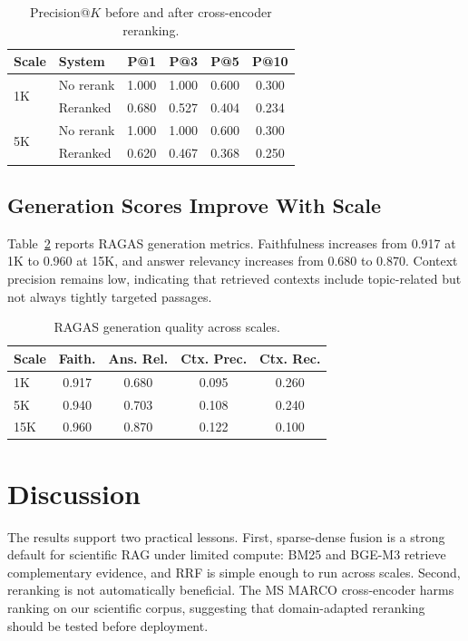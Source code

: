 \documentclass[11pt]{article}
\begin{document}
\begin{table}[!t]
\centering
\small
\caption{Precision@$K$ before and after cross-encoder reranking.}
\label{tab:rerank}
\begin{tabular}{llcccc}
\toprule
Scale & System & P@1 & P@3 & P@5 & P@10 \\
\midrule
\multirow{2}{*}{1K}
& No rerank & 1.000 & 1.000 & 0.600 & 0.300 \\
& Reranked & 0.680 & 0.527 & 0.404 & 0.234 \\
\midrule
\multirow{2}{*}{5K}
& No rerank & 1.000 & 1.000 & 0.600 & 0.300 \\
& Reranked & 0.620 & 0.467 & 0.368 & 0.250 \\
\bottomrule
\end{tabular}
\end{table}

\subsection{Generation Scores Improve With Scale}

Table~\ref{tab:ragas} reports RAGAS generation metrics. Faithfulness increases from 0.917 at 1K to 0.960 at 15K, and answer relevancy increases from 0.680 to 0.870. Context precision remains low, indicating that retrieved contexts include topic-related but not always tightly targeted passages.

\begin{table}[!t]
\centering
\small
\caption{RAGAS generation quality across scales.}
\label{tab:ragas}
\begin{tabular}{lcccc}
\toprule
Scale & Faith. & Ans. Rel. & Ctx. Prec. & Ctx. Rec. \\
\midrule
1K & 0.917 & 0.680 & 0.095 & 0.260 \\
5K & 0.940 & 0.703 & 0.108 & 0.240 \\
15K & 0.960 & 0.870 & 0.122 & 0.100 \\
\bottomrule
\end{tabular}
\end{table}

\FloatBarrier

\section{Discussion}

The results support two practical lessons. First, sparse-dense fusion is a strong default for scientific RAG under limited compute: BM25 and BGE-M3 retrieve complementary evidence, and RRF is simple enough to run across scales. Second, reranking is not automatically beneficial. The MS MARCO cross-encoder harms ranking on our scientific corpus, suggesting that domain-adapted reranking should be tested before deployment.
\end{document}
